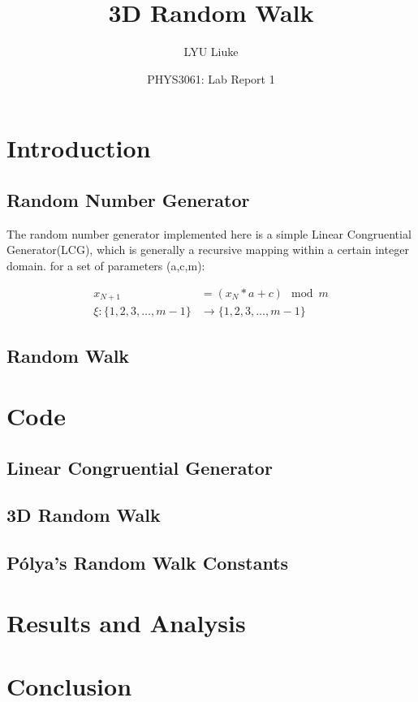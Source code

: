 \documentclass{article}
\title{3D Random Walk}
\author{LYU Liuke}
\date{PHYS3061: Lab Report 1}
\begin{document}
\maketitle
\tableofcontents

\section{Introduction}

\subsection{Random Number Generator}

The random number generator implemented here is a simple Linear Congruential
Generator(LCG), which is generally a recursive mapping within a certain integer
domain. for a set of parameters (a,c,m):

\begin{align*}
  x_{N+1} &= (x_N * a + c) \mod m \\
  \xi \colon \{1,2,3,\dots,m-1\} &\to \{1,2,3,\dots,m-1\}
\end{align*}

\subsection{Random Walk}

\section{Code}

\subsection{Linear Congruential Generator}

\subsection{3D Random Walk}

\subsection{P\'olya's Random Walk Constants}

\section{Results and Analysis}

\section{Conclusion}
\end{document}
